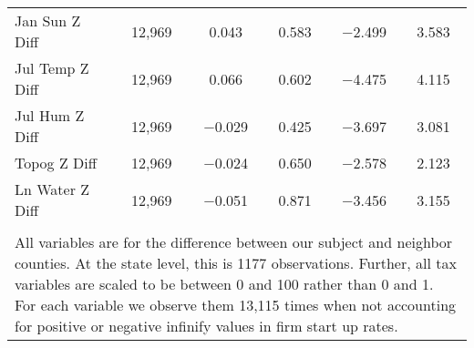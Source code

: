\begin{table}[!htbp]
\begin{tabular}{@{\extracolsep{5pt}}lccccc}
Jan Sun Z Diff & 12,969 & 0.043 & 0.583 & $-$2.499 & 3.583 \\ 
Jul Temp Z Diff & 12,969 & 0.066 & 0.602 & $-$4.475 & 4.115 \\ 
Jul Hum Z Diff & 12,969 & $-$0.029 & 0.425 & $-$3.697 & 3.081 \\ 
Topog Z Diff & 12,969 & $-$0.024 & 0.650 & $-$2.578 & 2.123 \\ 
Ln Water Z Diff & 12,969 & $-$0.051 & 0.871 & $-$3.456 & 3.155 \\ 
\hline \\[-1.8ex] 
\multicolumn{6}{l}{All variables are for the difference between our subject and neighbor counties. At the state level, this is 1177 observations. Further, all tax variables are scaled to be between 0 and 100 rather than 0 and 1. For each variable we observe them 13,115 times when not accounting for positive or negative infinify values in firm start up rates.} \\ 
\end{tabular} 
\end{table} 
